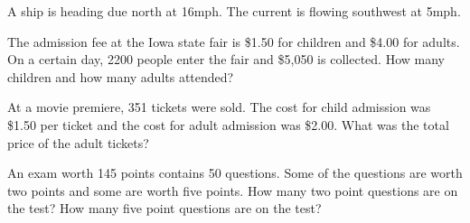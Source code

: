 \documentclass[addpoints]{exam}
\begin{document}
\begin{questions}
        
    
    \question[1] A ship is heading due north at 16mph. The current is flowing southwest at 5mph. 
    
    \newpage
    \question[1] The admission fee at the Iowa state fair is \$1.50 for children and \$4.00 for adults. On a certain day, 2200 people enter the fair and \$5,050 is collected. How many children and how many adults attended? 
    
    \question[1] At a movie premiere, 351 tickets were sold. The cost for child admission was \$1.50 per ticket and the cost for adult admission was \$2.00. What was the total price of the adult tickets?  
    
    \question[1] An exam worth 145 points contains 50 questions. Some of the questions are worth two points and some are worth five points. How many two point questions are on the test? How many five point questions are on the test? 
    \end{questions}
    
\newpage
\end{document}
